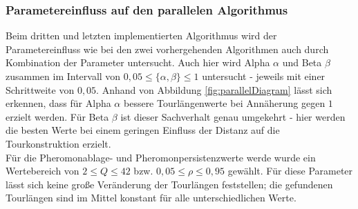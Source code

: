 \documentclass[doktyp=barbeit, sprache=german]{TUBAFarbeiten}
\begin{document}
\subsubsection{Parametereinfluss auf den parallelen Algorithmus}
Beim dritten und letzten implementierten Algorithmus wird der Parametereinfluss wie bei den zwei vorhergehenden Algorithmen auch durch Kombination der Parameter untersucht. Auch hier wird Alpha $\alpha$ und Beta $\beta$ zusammen im Intervall von $0,05 \leq \{\alpha,\beta\} \leq 1$ untersucht - jeweils mit einer Schrittweite von $0,05$. Anhand von Abbildung \ref{fig:parallelDiagram} lässt sich erkennen, dass für Alpha $\alpha$ bessere Tourlängenwerte bei Annäherung gegen $1$ erzielt werden. Für Beta $\beta$ ist dieser Sachverhalt genau umgekehrt - hier werden die besten Werte bei einem geringen Einfluss der Distanz auf die Tourkonstruktion erzielt.\\Für die Pheromonablage- und Pheromonpersistenzwerte werde wurde ein Wertebereich von $2 \leq Q \leq 42$ bzw. $0,05 \leq \rho \leq 0,95$ gewählt. Für diese Parameter lässt sich keine große Veränderung der Tourlängen feststellen; die gefundenen Tourlängen sind im Mittel konstant für alle unterschiedlichen Werte.
\end{document}
